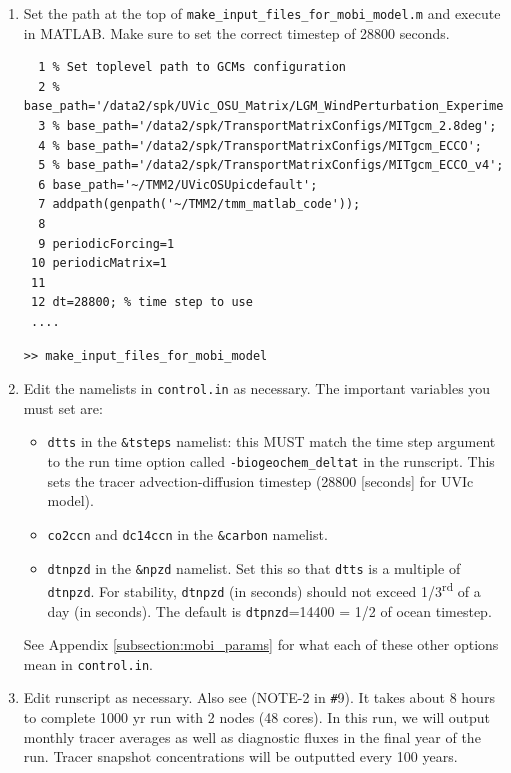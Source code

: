 \documentclass[a4paper]{article}
\def\noin{\noindent }
\begin{document}
\begin{enumerate}
\item Set the path at the top of \verb|make_input_files_for_mobi_model.m| and execute in MATLAB. Make sure to set the correct timestep of 28800 seconds. 
\lstset{language=matlab} 
\begin{lstlisting}[frame=single,basicstyle=\scriptsize,commentstyle=\color{blue}]
 % make_input_files_for_mobi_model.m
  1 % Set toplevel path to GCMs configuration
  2 % base_path='/data2/spk/UVic_OSU_Matrix/LGM_WindPerturbation_Experiments/no_embm_awind2/picdefault';
  3 % base_path='/data2/spk/TransportMatrixConfigs/MITgcm_2.8deg';
  4 % base_path='/data2/spk/TransportMatrixConfigs/MITgcm_ECCO';
  5 % base_path='/data2/spk/TransportMatrixConfigs/MITgcm_ECCO_v4';
  6 base_path='~/TMM2/UVicOSUpicdefault';
  7 addpath(genpath('~/TMM2/tmm_matlab_code'));
  8
  9 periodicForcing=1
 10 periodicMatrix=1
 11
 12 dt=28800; % time step to use
 ....
\end{lstlisting}
\begin{lstlisting}[style=DOS]
 >> make_input_files_for_mobi_model
\end{lstlisting}

\item Edit the namelists in \verb|control.in| as necessary. The important variables you 
must set are:

\begin{itemize}
\item \verb|dtts| in the \verb|&tsteps| namelist: this MUST match the time step argument to the run time option called \verb|-biogeochem_deltat| in the runscript. This sets the tracer advection-diffusion timestep (28800 [seconds] for UVIc model). 
\item \verb|co2ccn| and \verb|dc14ccn| in the \verb|&carbon| namelist. 
\item \verb|dtnpzd| in the \verb|&npzd| namelist. Set this so that \verb|dtts| is a multiple of \verb|dtnpzd|. For stability, \verb|dtnpzd| (in seconds) should not exceed 1/3\textsuperscript{rd} of a day (in seconds). The default is \verb|dtpnzd|=14400 = 1/2 of ocean timestep. 
\end{itemize}
\noin See Appendix \ref{subsection:mobi_params} for what each of these other options mean in \verb|control.in|. 

\item Edit runscript as necessary. Also see (NOTE-2 in \verb|#|9). It takes about 8 hours to complete 1000 yr run with 2 nodes (48 cores). In this run, we will output monthly tracer averages as well as diagnostic fluxes in the final year of the run. Tracer snapshot concentrations will be outputted every 100 years.


\end{enumerate}
\end{document}
